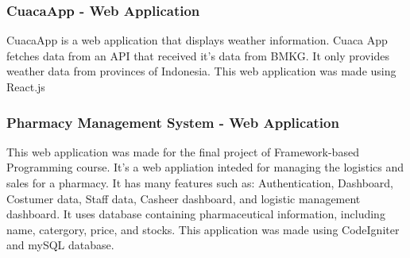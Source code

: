 \documentclass{article}
\begin{document}
\subsubsection{CuacaApp - Web Application}
CuacaApp is a web application that displays weather information. Cuaca App fetches data from an API that received it's data from BMKG. It only provides weather data from provinces of Indonesia. This web application was made using React.js  

\subsubsection{Pharmacy Management System - Web Application}
This web application was made for the final project of Framework-based Programming course. It's a web appliation inteded for managing the logistics and sales for a pharmacy. It has many features such as: Authentication, Dashboard, Costumer data, Staff data, Casheer dashboard, and logistic management dashboard. It uses database containing pharmaceutical information, including name, catergory, price, and stocks. This application was made using CodeIgniter and mySQL database.
\end{document}
